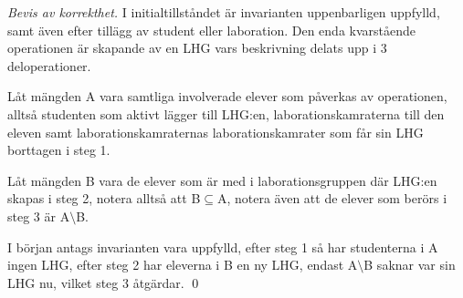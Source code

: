 \begin{proof}[Bevis av korrekthet]
I initialtillståndet är invarianten uppenbarligen uppfylld, samt även efter tillägg av student eller laboration. Den enda kvarstående operationen är skapande av en LHG vars beskrivning delats upp i 3 deloperationer. 

Låt mängden A vara samtliga involverade elever som påverkas av operationen, alltså studenten som aktivt lägger till LHG:en, laborationskamraterna till den eleven samt laborationskamraternas laborationskamrater som får sin LHG borttagen i steg 1. 

Låt mängden B vara de elever som är med i laborationsgruppen där LHG:en skapas i steg 2, notera alltså att B$\subseteq$A, notera även att de elever som berörs i steg 3 är A$\setminus$B.

I början antags invarianten vara uppfylld, efter steg 1 så har studenterna i A ingen LHG, efter steg 2 har eleverna i B en ny LHG, endast A$\setminus$B saknar var sin LHG nu, vilket steg 3 åtgärdar. \qed
 

\end{proof}

